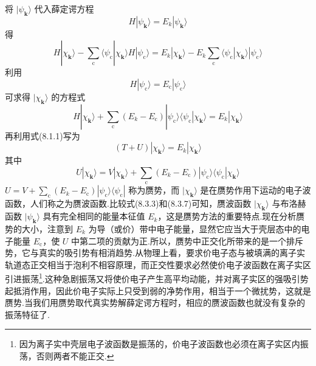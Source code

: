 将 $|\psi_{\boldsymbol{k}}\rangle$ 代入薛定谔方程
\begin{equation}
  H|\psi_{\boldsymbol{k}}\rangle=E_{k}|\psi_{\boldsymbol{k}}\rangle
\end{equation}
得
\begin{equation}
  H|\chi_{\boldsymbol{k}}\rangle-\sum_{\mathrm{c}}\langle\psi_{\mathrm{c}}|\chi_{\boldsymbol{k}}\rangle H|\psi_{\mathrm{c}}\rangle
  =E_{k}|\chi_{\boldsymbol{k}}\rangle-E_{k}\sum_{\mathrm{c}}\langle\psi_{\mathrm{c}}|\chi_{\boldsymbol{k}}\rangle|\psi_{\mathrm{c}}\rangle
\end{equation}
利用
\begin{equation}
  H|\psi_{\mathrm{c}}\rangle=E_{\mathrm{c}}|\psi_{\mathrm{c}}\rangle
\end{equation}
可求得 $|\chi_{\boldsymbol{k}}\rangle$ 的方程式
\begin{equation}
  H|\chi_{\boldsymbol{k}}\rangle+\sum_{\mathrm{c}}(E_{k}-E_{\mathrm{c}})|\psi_{\mathrm{c}}\rangle\langle\psi_{\mathrm{c}}|\chi_{\boldsymbol{k}}\rangle=E_{k}|\chi_{\boldsymbol{k}}\rangle
\end{equation}
再利用式(8.1.1)写为
\begin{equation}
  (T+U)|\chi_{\boldsymbol{k}}\rangle=E_{k}|\chi_{\boldsymbol{k}}\rangle
\end{equation}
其中
\begin{equation}
  U|\chi_{\boldsymbol{k}}\rangle=V|\chi_{\boldsymbol{k}}\rangle
  +\sum_{\mathrm{c}}(E_{k}-E_{\mathrm{c}})|\psi_{\mathrm{c}}\rangle\langle\psi_{\mathrm{c}}|\chi_{\boldsymbol{k}}\rangle
\end{equation}
$U=V+\sum_{\mathrm{c}}(E_{k}-E_{\mathrm{c}})|\psi_{\mathrm{c}}\rangle\langle\psi_{\mathrm{c}}|$ 称为赝势，而 $|\chi_{\boldsymbol{k}}\rangle$ 是在赝势作用下运动的电子波函数，人们称之为赝波函数.比较式(8.3.3)和(8.3.7)可知，赝波函数 $|\chi_{\boldsymbol{k}}\rangle$ 与布洛赫函数 $|\psi_{\boldsymbol{k}}\rangle$ 具有完全相同的能量本征值 $E_{k}$，这是赝势方法的重要特点.现在分析赝势的大小，注意到 $E_{k}$ 为导（或价）带中电子能量，显然它应当大于壳层态中的电子能量 $E_{\mathrm{c}}$，使 $U$ 中第二项的贡献为正.所以，赝势中正交化所带来的是一个排斥势，它与真实的吸引势有相消趋势.从物理上看，要求价电子态与被填满的离子实轨道态正交相当于泡利不相容原理，而正交性要求必然使价电子波函数在离子实区引进振荡\footnote{因为离子实中壳层电子波函数是振荡的，价电子波函数也必须在离子实区内振荡，否则两者不能正交.}.这种急剧振荡又将使价电子产生高平均动能，并对离子实区的强吸引势起抵消作用，因此价电子实际上只受到弱的净势作用，相当于一个微扰势，这就是赝势.当我们用赝势取代真实势解薛定谔方程时，相应的赝波函数也就没有复杂的振荡特征了.

